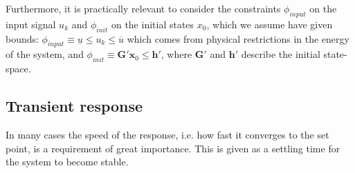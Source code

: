 \documentclass[sigconf]{llncs}
\newcommand{\mat}[1]{\boldsymbol{#1}}
\renewcommand{\vec}[1]{\boldsymbol{#1}}
\begin{document}


Furthermore, it is practically relevant to consider the 
constraints $\phi_\mathit{input}$ on the input
signal $u_{k}$ and $\phi_\mathit{init}$ on the initial states $x_0$,
which we assume have given bounds:
$\phi_\mathit{input}\equiv \underline{u} \leq u_k \leq \overline{u}$
which comes from physical restrictions in the energy of the system, and
$\phi_\mathit{init}\equiv \mat{G}' \vec{x}_0 \leq \vec{h}'$,
where $\mat{G}'$ and $\vec{h}'$ describe the initial state-space.

%
%

\subsection{Transient response} 
\label{ssec:transientspecification}
In many cases the speed of the response, i.e. how fast it converges to the set point, is a requirement of great importance. 
This is given as a settling time for the system to become stable.
 
\end{document}

